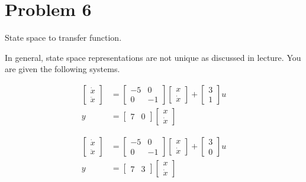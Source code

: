 \section{Problem 6}
State space to transfer function.

In general, state space representations are not unique as discussed in lecture. You are given the following systems.


    \begin{align}
        \begin{bmatrix}
            \dot{x} \\
            \ddot{x}
        \end{bmatrix} &=
        \begin{bmatrix}
            -5 & 0 \\
            0  & -1
        \end{bmatrix}
        \begin{bmatrix}
            x \\
            \dot{x}
        \end{bmatrix} + 
        \begin{bmatrix}
            3\\
            1
        \end{bmatrix}
        u \label{eq:16}
        \\
        y &=
        \begin{bmatrix}
            7 & 0
        \end{bmatrix}
        \begin{bmatrix}
            x \\
            \dot{x}
        \end{bmatrix} \label{eq:17}
    \end{align}



\begin{align}
    \begin{bmatrix}
        \dot{x} \\
        \ddot{x}
    \end{bmatrix} &=
    \begin{bmatrix}
        -5 & 0 \\
        0  & -1
    \end{bmatrix}
    \begin{bmatrix}
        x \\
        \dot{x}
    \end{bmatrix} + 
    \begin{bmatrix}
        3\\
        0
    \end{bmatrix}
    u\label{eq:18}
    \\
    y &=
    \begin{bmatrix}
        7 & 3
    \end{bmatrix}
    \begin{bmatrix}
        x \\
        \dot{x}
    \end{bmatrix}\label{eq:19}
\end{align}

